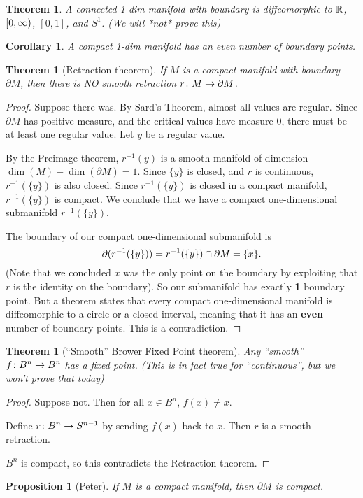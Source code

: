 \documentclass[11pt]{amsbook}
\theoremstyle{mystyle} %
\newtheorem{thrm}[thm]{Theorem}
\newtheorem{coro}[thm]{Corollary}
\newtheorem{propo}[thm]{Proposition}
\numberwithin{thm}{section}
\renewcommand{\d}{\partial}
\begin{document}
\begin{thrm}
	A connected 1-dim manifold with boundary is diffeomorphic to ${\mathbb R}$, $[0,\infty)$, $[0,1]$, and $S^1$.  (We will *not* prove this)
\end{thrm}
\begin{coro}
	A compact 1-dim manifold has an even number of boundary points.
\end{coro}
\begin{thrm}[Retraction theorem]
	If $M$ is a compact manifold with boundary $\d M$, then there is NO smooth retraction $r \from M \to \d M$.
\end{thrm}
\begin{proof}
	Suppose there was.  By Sard's Theorem, almost all values are regular.  Since $\d M$ has positive measure, and the critical values have measure 0, there must be at least one regular value.  Let $y$ be a regular value.

	By the Preimage theorem, $r^{-1}(y)$ is a smooth manifold of dimension $\dim(M) - \dim(\d M) = 1$.  Since $\{y\}$ is closed, and $r$ is continuous, $r^{-1}(\{y\})$ is also closed.  Since $r^{-1}(\{y\})$ is closed in a compact manifold, $r^{-1}(\{y\})$ is compact.  We conclude that we have a compact one-dimensional submanifold $r^{-1}(\{y\})$.

	The boundary of our compact one-dimensional submanifold is $$\d (r ^{-1}(\{y\})) = r^{-1}(\{y\}) \intersect \d M = \{x\}.$$  (Note that we concluded $x$ was the only point on the boundary by exploiting that $r$ is the identity on the boundary).   So our submanifold has exactly \textbf{1} boundary point.  But a theorem states that every compact one-dimensional manifold is diffeomorphic to a circle or a closed interval, meaning that it has an \textbf{even} number of boundary points.  This is a contradiction.
\end{proof}
\begin{thrm}[``Smooth'' Brower Fixed Point theorem]
	Any ``smooth'' $f \colon B^n \to B^n$ has a fixed point.  (This is in fact true for ``continuous'', but we won't prove that today)
\end{thrm}
\begin{proof}
	Suppose not.  Then for all $x \in B^n$, $f(x) \not= x$.

	Define $r \colon B^n \to S^{n-1}$ by sending $f(x)$ back to $x$.  Then $r$ is a smooth retraction.

	$B^n$ is compact, so this contradicts the Retraction theorem.
\end{proof}
\begin{propo}[Peter]
	If $M$ is a compact manifold, then $\d M$ is compact.
\end{propo}
\end{document}
